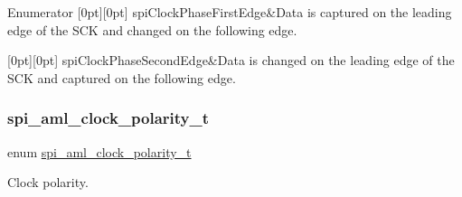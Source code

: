 \begin{DoxyEnumFields}{Enumerator}
[0pt][0pt]{}\mbox{\label{group__enum__group_ggaa95bcc4aa184cc2df42df55e6d8c2d3aaec1cd61e1e61c864a36166105525dd86}} 
spi\+Clock\+Phase\+First\+Edge&Data is captured on the leading edge of the S\+CK and changed on the following edge. \\
\hline

[0pt][0pt]{}\mbox{\label{group__enum__group_ggaa95bcc4aa184cc2df42df55e6d8c2d3aaf4fa237620d516ad44263d9573441a6c}} 
spi\+Clock\+Phase\+Second\+Edge&Data is changed on the leading edge of the S\+CK and captured on the following edge. \\
\hline

\end{DoxyEnumFields}
\mbox{\label{group__enum__group_ga846bf859b73b0a584889013e680bdc5f}} 
\subsubsection{\texorpdfstring{spi\_aml\_clock\_polarity\_t}{spi\_aml\_clock\_polarity\_t}}
{\footnotesize\ttfamily enum \mbox{\hyperlink{group__enum__group_ga846bf859b73b0a584889013e680bdc5f}{spi\+\_\+aml\+\_\+clock\+\_\+polarity\+\_\+t}}}



Clock polarity. 

